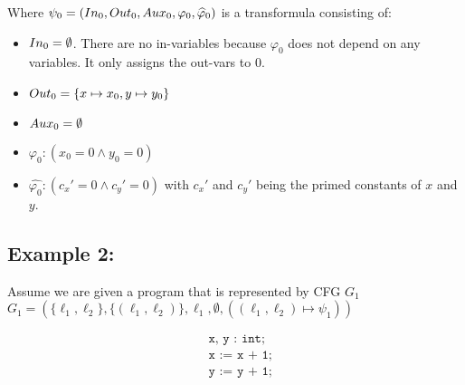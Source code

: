 \documentclass{article}
\begin{document}
	Where $\psi_0 = (In_0, Out_0, Aux_0, \varphi_0, \widehat{\varphi}_0)$ is a transformula consisting of: 
	\begin{itemize}
		\item $In_0 = \emptyset$. There are no in-variables because $\varphi_0$ does not depend on any variables. It only assigns the out-vars to 0.
		\item $Out_0 = \{ x \mapsto x_0, y \mapsto y_0\}$
		\item $Aux_0 = \emptyset$
		\item $\varphi_0: (x_0 = 0 \land y_0 = 0)$
		\item $\widehat{\varphi_0}: (c_x' = 0 \land c_y' = 0)$ with $c_x'$ and $c_y'$ being the primed constants of $x$ and $y$.
	\end{itemize}
	
	
	\subsection*{Example 2:}
	Assume we are given a program that is represented by CFG $G_1$ \\ $G_1 = (\{ \ell_1, \ell_2 \}, \{ (\ell_1, \ell_2)\}, \ell_1, \emptyset, ((\ell_1, \ell_2) 
	\mapsto \psi_1))$

		\begin{minipage}{.3\textwidth}
			\centering
			\begin{align*}
				&\texttt{x, y : int}; \\
				&\texttt{x := x + 1}; \\
				&\texttt{y := y + 1;}
			\end{align*}

			
			\label{fig:square}
		\end{minipage}%
		\hfill
		\begin{minipage}{.6\textwidth}
			\centering
			\label{fig:rect}
		\end{minipage}%
\bigskip
\end{document}
